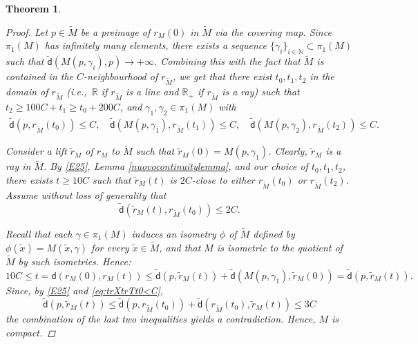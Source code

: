 \documentclass[10pt]{article}
\newtheorem{thm}{Theorem}[section]
\theoremstyle{definition}
\newcommand{\bb}[1]{\mathbb{#1}}
\newcommand{\sd}{\mathsf{d}}
\begin{document}
\begin{thm}
\begin{proof}
        Let $p \in \tilde{M}$ be a preimage of $r_M(0)$ in $\tilde{M}$ via the covering map.
        Since $\pi_1(M)$ has infinitely many elements, there exists a sequence $\{\gamma_i\}_{i \in \bb{N}} \subset \pi_1(M)$ such that $\tilde{\sd}(M(p,\gamma_i),p) \to + \infty$.
        Combining this with the fact that $\tilde{M}$ is contained in the $C$-neighbourhood of $r_{\tilde{M}}$, we get that there exist $t_0,t_1,t_2$ in the domain of $r_{\tilde{M}}$ (i.e.,\ $\bb{R}$ if $r_{\tilde{M}}$ is a line and $\bb{R}_+$ if $r_{\tilde{M}}$ is a ray) such that $t_2 \geq 100C+t_1 \geq t_0+200C $, and $\gamma_1,\gamma_2 \in \pi_1(M)$ with
        \begin{equation} \label{E25}
        \begin{split}
        \tilde{\sd}(p,r_{\tilde{M}}(t_0))\leq C, \quad
        \tilde{\sd}(M(p,\gamma_1),r_{\tilde{M}}(t_1)) \leq C, \quad \tilde{\sd}(M(p,\gamma_2),r_{\tilde{M}}(t_2)) \leq C.
        \end{split}
        \end{equation}
         
         Consider a lift $\tilde{r}_M$ of $r_M$ to $\tilde{M}$ such that 
         $\tilde{r}_M(0)=M(p,\gamma_1)$. Clearly, $\tilde{r}_M$ is a ray in $\tilde{M}$. By \eqref{E25}, Lemma \ref{nuovocontinuitylemma}, and our choice of $t_0,t_1,t_2$, there exists $t\geq 10C$ such that $\tilde{r}_M(t)$ is $2C$-close to either $r_{\tilde{M}}(t_0)$ or $r_{\tilde{M}}(t_2)$. Assume without loss of generality that
         \begin{equation}\label{eq:trXtrTt0<C}
         \tilde{\sd}(\tilde{r}_M(t), r_{\tilde{M}}(t_0))\leq 2C.
         \end{equation}
         
         Recall that each $\gamma \in \pi_1(M)$ induces an isometry $\phi$ of $\tilde{M}$ defined by $\phi(\tilde{x})=M(\tilde{x},\gamma)$ for every $\tilde{x} \in \tilde{M}$, and that $M$ is isometric to the quotient of $\tilde{M}$ by such isometries.
         Hence: 
         \[
         10C \leq t = 
         {\sd}(r_M(0),r_M(t)) \leq \tilde{\sd}(p,\tilde{r}_M(t))+\tilde{\sd}(M(p,\gamma_1),\tilde{r}_M(0))=\tilde{\sd}(p,\tilde{r}_M(t)).
         \]
         Since, by \eqref{E25} and \eqref{eq:trXtrTt0<C}, 
         \[
        \tilde{\sd}(p,\tilde{r}_M(t))\leq\tilde{\sd}(p,r_{\tilde{M}}(t_0))+\tilde{\sd}(r_{\tilde{M}}(t_0), \tilde{r}_M(t)) \leq 3C
        \]
          the combination of the last two inequalities yields a contradiction. Hence, $M$ is compact.
          

\end{proof}
\end{thm}
\end{document}
